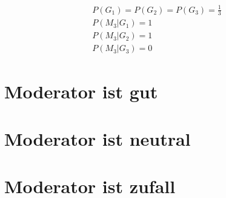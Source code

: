 \begin{equation} \label{eq1}
\begin{split}
    P(G_1) = P(G_2) = P(G_3) = \frac{1}{3} \\
    P(M_3 | G_1) = 1 \\
    P(M_3 | G_2) = 1 \\ 
    P(M_3 | G_3) = 0
\end{split}
\end{equation}

\section{Moderator ist gut}

\section{Moderator ist neutral}

\section{Moderator ist zufall}